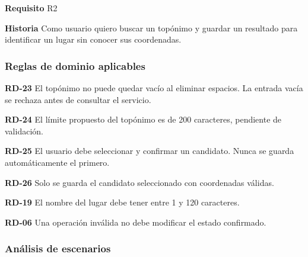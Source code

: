 \textbf{Requisito} R2\par

\textbf{Historia} Como usuario quiero buscar un topónimo y guardar un resultado para identificar un lugar sin conocer sus coordenadas.\par

\subsubsection*{Reglas de dominio aplicables}

\textbf{RD-23} El topónimo no puede quedar vacío al eliminar espacios. La entrada vacía se rechaza antes de consultar el servicio.\par

\textbf{RD-24} El límite propuesto del topónimo es de 200 caracteres, pendiente de validación.\par

\textbf{RD-25} El usuario debe seleccionar y confirmar un candidato. Nunca se guarda automáticamente el primero.\par

\textbf{RD-26} Solo se guarda el candidato seleccionado con coordenadas válidas.\par

\textbf{RD-19} El nombre del lugar debe tener entre 1 y 120 caracteres.\par

\textbf{RD-06} Una operación inválida no debe modificar el estado confirmado.\par

\subsubsection*{Análisis de escenarios}

